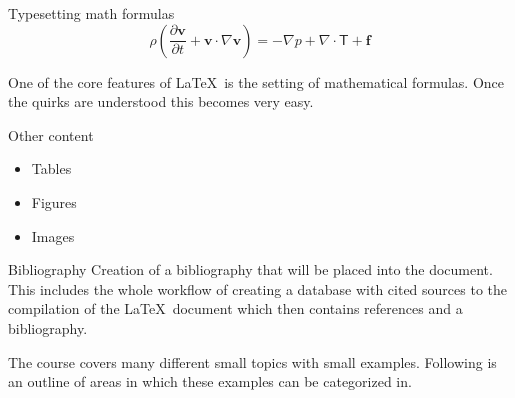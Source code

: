 \documentclass[10pt, a4paper]{beamer} %
\begin{document}
    \begin{frame}[t]{Typesetting math formulas}
    \vspace{1cm}
    \[ \rho\left( \frac{\partial \mathbf{v}}{\partial t} + \mathbf{v}\cdot\nabla\mathbf{v}\right) = -\nabla p + \nabla\cdot\mathsf{T}+\mathbf{f} \]

    \vspace*{\fill}
    One of the core features of \LaTeX\ is the setting of mathematical formulas. Once the quirks are understood this becomes very easy.
    \vspace*{\fill}
    \end{frame}
    

    \begin{frame}{Other content}
    \begin{itemize}
        \item Tables
        \item Figures
        \item Images
    \end{itemize}
    \end{frame}

    
    \begin{frame}{Bibliography}
    Creation of a bibliography that will be placed into the document. This includes the whole workflow of creating a database with cited sources to the compilation of the \LaTeX\ document which then contains references and a bibliography.

    The course covers many different small topics with small examples. Following is an outline of areas in which these examples can be categorized in.
    \end{frame}





    
\end{document}
